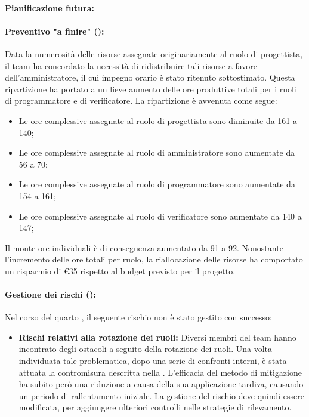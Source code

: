 \paragraph*{Pianificazione futura:}

\paragraph*{Preventivo "a finire" ():}
\par Data la numerosità delle risorse assegnate originariamente al ruolo di progettista, il team ha concordato la necessità di ridistribuire tali risorse a favore dell'amministratore, il cui impegno orario è stato ritenuto sottostimato. Questa ripartizione ha portato a un lieve aumento delle ore produttive totali per i ruoli di programmatore e di verificatore. 
La ripartizione è avvenuta come segue:
\begin{itemize}
  \item Le ore complessive assegnate al ruolo di progettista sono diminuite da 161 a 140;
  \item Le ore complessive assegnate al ruolo di amministratore sono aumentate da 56 a 70;
  \item Le ore complessive assegnate al ruolo di programmatore sono aumentate da 154 a 161;
  \item Le ore complessive assegnate al ruolo di verificatore sono aumentate da 140 a 147;
\end{itemize}
Il monte ore individuali è di conseguenza aumentato da 91 a 92. Nonostante l'incremento delle ore totali per ruolo, la riallocazione delle risorse ha comportato un risparmio di €35 rispetto al budget previsto per il progetto.

\paragraph*{Gestione dei rischi ():}
\par Nel corso del quarto , il seguente rischio non è stato gestito con successo:
\begin{itemize}
  \item \textbf{Rischi relativi alla rotazione dei ruoli:} Diversi membri del team hanno incontrato degli ostacoli a seguito della rotazione dei ruoli. Una volta individuata tale problematica, dopo una serie di confronti interni, è stata attuata la contromisura descritta nella . L'efficacia del metodo di mitigazione ha subito però una riduzione a causa della sua applicazione tardiva, causando un periodo di rallentamento iniziale. La gestione del rischio deve quindi essere modificata, per aggiungere ulteriori controlli nelle strategie di rilevamento.
\end{itemize}